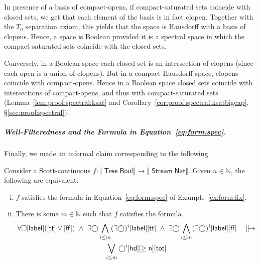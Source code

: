 \documentclass[%
  a4paper,
  UKenglish,
  cleveref,
  autoref,
  thm-restate,
  numberwithinsect,
]{lipics-v2021}
\newcommand\NN{\mathbb{N}}
\newcommand\I[1]{\llbracket #1 \rrbracket} %
\newcommand\Next{\mathord{\bigcirc}}
\renewcommand{\Box}{\square}
\newcommand\term[1]{\mathsf{#1}}
\newcommand\type[1]{\term{#1}}
\newcommand\hd{\mathop{\term{hd}}}
\newcommand\lbl{\mathop{\term{label}}}
\newcommand\Bool{\type{Bool}}
\newcommand\Nat{\type{Nat}}
\newcommand\Stream{\mathop{\type{Stream}}}
\newcommand\Tree{\mathop{\type{Tree}}}
\newcommand\true{\term{tt}}
\newcommand\false{\term{ff}}
\newcommand\defrealto{\mathrel\parallel\joinrel\to}
\newcommand\realto{\mathrel{\defrealto}}
\newcommand\tot{\term{tot}}
\newcommand\form[1]{\lbrack #1 \rbrack}
\begin{document}
In presence of a basis of compact-opens,
if compact-saturated sets coincide with closed sets,
we get that each element of the basis is in fact clopen.
Together with the $T_0$ separation axiom, this yields that
the space is Hausdorff with a basis of clopens.
Hence, a space is Boolean provided it is
a spectral space in which the compact-saturated
sets coincide with the closed sets.

Conversely, in a Boolean space each closed set is an
intersection of clopens (since each open is a union of clopens).
But in a compact Hausdorff space, clopens coincide with
compact-opens.
Hence in a Boolean space
closed sets coincide with intersections of compact-opens,
and thus with compact-saturated sets
(Lemma~\ref{lem:proof:spectral:ksat}
and Corollary~\ref{cor:proof:spectral:ksatbigcap},
\S\ref{sec:proof:spectral}).

\subparagraph*{Well-Filteredness and the Formula in Equation~\eqref{eq:form:spec}.}
Finally, we made an informal claim corresponding to the following.

\begin{lemma}
\label{lem:proof:ex:sem:log:fixpoints}
Consider a Scott-continuous
$f \colon \I{\Tree \Bool} \to \I{\Stream \Nat}$.
Given $n \in \NN$, the following are equivalent:
\begin{enumerate}[(i)]
\item
\label{item:proof:ex:sem:log:fixpoints:spec}
$f$ satisfies the formula in Equation~\eqref{eq:form:spec}
of Example~\ref{ex:form:fix}.

\item
\label{item:proof:ex:sem:log:fixpoints:unif}
There is some $m \in \NN$ such that $f$ satisfies the formula
\begin{multline*}
  \forall\Box\form\lbl(\form\true \lor \form\false)
  ~\land~
  \exists\Next \bigwedge_{i \leq m} (\exists\Next)^i \form\lbl\form\true
  ~\land~
  \exists\Next \bigwedge_{i \leq m} (\exists\Next)^i \form\lbl\form\false
  \quad\realto
\\
  \bigvee_{i \leq m}\Next^i \form\hd \form{\geq \term n} \form\tot
\end{multline*}
\end{enumerate}
\end{lemma}
\end{document}
